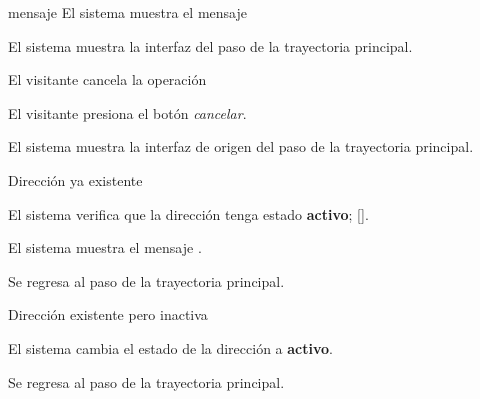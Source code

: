{\begin{trayectoriaPrincipal}
    \item[mensaje] El sistema muestra el mensaje

    \item El sistema muestra la interfaz del paso 
      de la trayectoria principal.

  \end{trayectoriaPrincipal}


  \begin{trayectoriaAlternativa}
    {El visitante cancela la operación}

    \item El visitante presiona el botón \textit{cancelar}.

    \item El sistema muestra la interfaz de origen del paso
       de la trayectoria principal.

  \end{trayectoriaAlternativa}


  \begin{trayectoriaAlternativa}
    {Dirección ya existente}

    \item El sistema verifica que la dirección tenga estado \textbf{activo};
      [].

    \item El sistema muestra el mensaje
      .

    \item Se regresa al paso  de la trayectoria
      principal.

  \end{trayectoriaAlternativa}


  \begin{trayectoriaAlternativa}
    {Dirección existente pero inactiva}

    \item El sistema cambia el estado de la dirección a \textbf{activo}.

    \item Se regresa al paso  de la trayectoria
      principal.

  \end{trayectoriaAlternativa}
}
